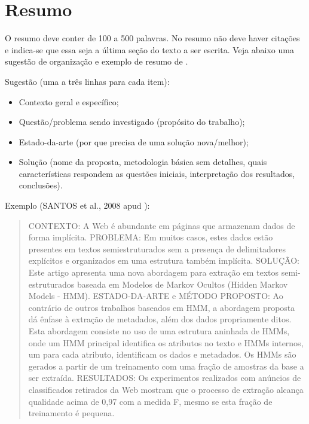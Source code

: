 \documentclass[twoside,english,brazilian]{UNISINOSmonografia}
\begin{document}
\section{Resumo}
O resumo deve conter de 100 a 500 palavras. No resumo não deve haver citações e indica-se que essa seja a última seção do texto a ser escrita. Veja abaixo uma sugestão de organização e exemplo de resumo de .

Sugestão (uma a três linhas para cada item):
\begin{itemize}
	\item Contexto geral e específico;
	\item Questão/problema sendo investigado (propósito do trabalho);
	\item Estado-da-arte (por que precisa de uma solução nova/melhor);
	\item Solução (nome da proposta, metodologia básica sem detalhes, quais características respondem as questões iniciais, interpretação dos resultados, conclusões).
\end{itemize}

Exemplo (SANTOS et al., 2008 apud \citealp{Moro11}):
\begin{quote}
CONTEXTO: A Web é abundante em páginas que armazenam  dados de forma implícita. PROBLEMA: Em muitos casos, estes dados estão presentes em textos semiestruturados sem a presença de delimitadores explícitos e organizados em uma estrutura também implícita. SOLUÇÃO: Este artigo apresenta uma nova abordagem para extração em textos semi-estruturados baseada em Modelos de Markov Ocultos (Hidden Markov Models - HMM). ESTADO-DA-ARTE e MÉTODO PROPOSTO: Ao contrário de outros trabalhos baseados em HMM, a abordagem proposta dá ênfase à extração de metadados, além dos dados propriamente ditos. Esta abordagem consiste no uso de uma estrutura aninhada de HMMs, onde um HMM principal identifica os atributos no texto e HMMs internos, um para cada atributo, identificam os dados e metadados. Os HMMs são gerados a partir de um treinamento com uma fração de amostras da base a ser extraída. RESULTADOS: Os experimentos realizados com anúncios de classificados retirados da Web mostram que o processo de extração alcança qualidade acima de 0,97 com a medida F, mesmo se esta fração de treinamento é pequena. 
\end{quote}

\end{document}
